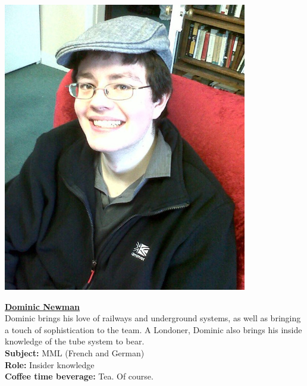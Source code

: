 \documentclass[a4paper,11pt]{article}  %
\begin{document}
\noindent \begin{minipage}{0.4\textwidth}
  \includegraphics[width=0.8\textwidth]{DominicProfile.jpg}
\end{minipage}
\hfill
\begin{minipage}{0.6\textwidth}
  {\large \textbf{\underline{Dominic Newman}}}\\

  Dominic brings his love of railways and underground systems, as well
  as bringing a touch of sophistication to the team. A Londoner, Dominic
  also brings his inside knowledge of the tube system to bear.\\

  \textbf{Subject:} MML (French and German)\\
  \textbf{Role:} Insider knowledge\\
  \textbf{Coffee time beverage:} Tea. Of course.
\end{minipage}

\bigskip
\end{document}
